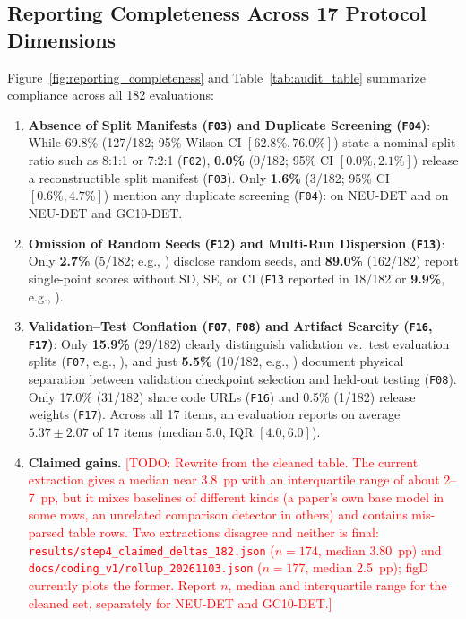 \documentclass[pdflatex,sn-apa]{sn-jnl}
\newcommand{\todo}[1]{\textcolor{red}{[TODO: #1]}}
\begin{document}
\subsection{Reporting Completeness Across 17 Protocol Dimensions}
Figure~\ref{fig:reporting_completeness} and Table~\ref{tab:audit_table} summarize compliance across all 182 evaluations:
\begin{enumerate}[leftmargin=2em]
    \item \textbf{Absence of Split Manifests (\texttt{F03}) and Duplicate Screening (\texttt{F04})}: While 69.8\% (127/182; 95\% Wilson CI $[62.8\%, 76.0\%]$) state a nominal split ratio such as 8:1:1 or 7:2:1 (\texttt{F02}), \textbf{0.0\%} (0/182; 95\% CI $[0.0\%, 2.1\%]$) release a reconstructible split manifest (\texttt{F03}). Only \textbf{1.6\%} (3/182; 95\% CI $[0.6\%, 4.7\%]$) mention any duplicate screening (\texttt{F04}): \citet{chen2026confidence} on NEU-DET and \citet{yang2026improved} on NEU-DET and GC10-DET.
    \item \textbf{Omission of Random Seeds (\texttt{F12}) and Multi-Run Dispersion (\texttt{F13})}: Only \textbf{2.7\%} (5/182; e.g., \citealp{hu2026_pmc12986859,zhu2026_pmc13418091,huang2026_pmc13618933}) disclose random seeds, and \textbf{89.0\%} (162/182) report single-point scores without SD, SE, or CI (\texttt{F13} reported in 18/182 or \textbf{9.9\%}, e.g., \citealp{zhang2025_pmc12350654,fan2025_pmc12770479,duan2026_pmc12881659,wang2026_pmc13029871,zhang2026_pmc13056895,jin2026_pmc13280455,sun2026_pmc13412141,rong2026_pmc13708875}).
    \item \textbf{Validation--Test Conflation (\texttt{F07}, \texttt{F08}) and Artifact Scarcity (\texttt{F16}, \texttt{F17})}: Only \textbf{15.9\%} (29/182) clearly distinguish validation vs.\ test evaluation splits (\texttt{F07}, e.g., \citealp{wang2023_pmc10300763,zhang2023_pmc10582940,ma2023_pmc10675464,chen2023_pmc10719359,zou2024_pmc10935385,gao2024_pmc11001973,wang2024_pmc11091066,sun2025_pmc12298282}), and just \textbf{5.5\%} (10/182, e.g., \citealp{chen2022_pmc8838028,nguyen2022_pmc9783860,ma2023_pmc10675464,zou2024_pmc10935385,ahangar2026_pmc12899597,chen2026_pmc13562717,huang2026_pmc13618933,yang2026improved}) document physical separation between validation checkpoint selection and held-out testing (\texttt{F08}). Only 17.0\% (31/182) share code URLs (\texttt{F16}) and 0.5\% (1/182) release weights (\texttt{F17}). Across all 17 items, an evaluation reports on average $5.37 \pm 2.07$ of 17 items (median $5.0$, IQR $[4.0, 6.0]$).
    \item \textbf{Claimed gains.} \todo{Rewrite from the cleaned table. The current extraction gives a median near 3.8~pp with an interquartile range of about 2--7~pp, but it mixes baselines of different kinds (a paper's own base model in some rows, an unrelated comparison detector in others) and contains mis-parsed table rows. Two extractions disagree and neither is final: \texttt{results/step4\_claimed\_deltas\_182.json} ($n=174$, median 3.80~pp) and \texttt{docs/coding\_v1/rollup\_20261103.json} ($n=177$, median 2.5~pp); figD currently plots the former. Report $n$, median and interquartile range for the cleaned set, separately for NEU-DET and GC10-DET.}
\end{enumerate}
\end{document}
